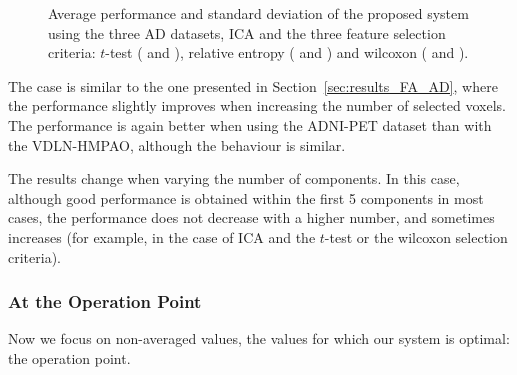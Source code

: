 \begin{figure}
	
	\caption{Average performance and standard deviation of the proposed system using the three \ac{AD} datasets, \ac{ICA} and the three feature selection criteria: $t$-test (\protect{} and \protect{}), relative entropy (\protect{} and \protect{}) and wilcoxon (\protect{} and \protect{}). } 
	\label{fig:accuracyMeanICA-AD}
\end{figure}

The case is similar to the one presented in Section~\ref{sec:results_FA_AD}, where the performance slightly improves when increasing the number of selected voxels. The performance is again better when using the ADNI-PET dataset than with the VDLN-HMPAO, although the behaviour is similar. 

The results change when varying the number of components. In this case, although good performance is obtained within the first 5 components in most cases, the performance does not decrease with a higher number, and sometimes increases (for example, in the case of \ac{ICA} and the $t$-test or the wilcoxon selection criteria). 
\subsubsection{At the Operation Point}
Now we focus on non-averaged values, the values for which our system is optimal: the operation point. 

